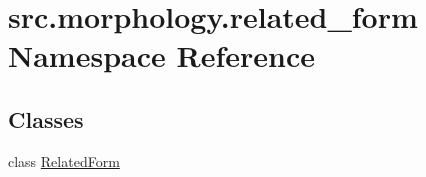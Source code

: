 \hypertarget{namespacesrc_1_1morphology_1_1related__form}{\section{src.\+morphology.\+related\+\_\+form Namespace Reference}
\label{namespacesrc_1_1morphology_1_1related__form}
}
\subsection*{Classes}
\begin{DoxyCompactItemize}
\item 
class \hyperlink{classsrc_1_1morphology_1_1related__form_1_1_related_form}{Related\+Form}
\end{DoxyCompactItemize}
